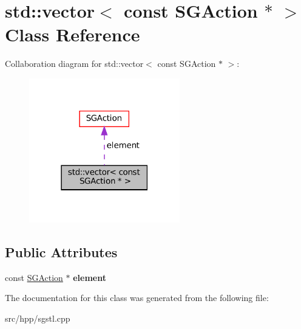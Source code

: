 \hypertarget{classstd_1_1vector_3_01const_01SGAction_01_5_01_4}{}\section{std\+:\+:vector$<$ const S\+G\+Action $\ast$ $>$ Class Reference}
\label{classstd_1_1vector_3_01const_01SGAction_01_5_01_4}


Collaboration diagram for std\+:\+:vector$<$ const S\+G\+Action $\ast$ $>$\+:
\nopagebreak
\begin{figure}[H]
\begin{center}
\leavevmode
\includegraphics[width=186pt]{classstd_1_1vector_3_01const_01SGAction_01_5_01_4__coll__graph}
\end{center}
\end{figure}
\subsection*{Public Attributes}
\begin{DoxyCompactItemize}
\item 
\mbox{\label{classstd_1_1vector_3_01const_01SGAction_01_5_01_4_abbcd12e159edf465bae1ae34828921f6}} 
const \hyperlink{classSGAction}{S\+G\+Action} $\ast$ {\bfseries element}
\end{DoxyCompactItemize}


The documentation for this class was generated from the following file\+:\begin{DoxyCompactItemize}
\item 
src/hpp/sgstl.\+cpp\end{DoxyCompactItemize}
